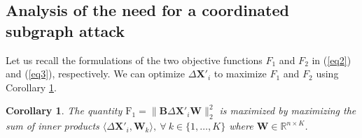 \documentclass[conference,compsoc]{IEEEtran}
\newtheorem{cor}{Corollary}[thm]
\begin{document}
\subsection{Analysis of the need for a coordinated subgraph attack}
\par Let us recall the formulations of the two objective functions $F_1$ and $F_2$ in (\ref{eq2}) and (\ref{eq3}), respectively. We can optimize $\Delta \boldsymbol{X'}_i$ to maximize $F_1$ and $F_2$ using Corollary \ref{corollary}.
\begin{cor}
\label{corollary}
The quantity
$\mathrm{F}_1=\|\boldsymbol{B} \Delta \boldsymbol{X'}_i \boldsymbol{W}\|_2^2$
is maximized by maximizing the sum of inner products $\langle\Delta \boldsymbol{X'}_i, \boldsymbol{W}_k \rangle, ~\forall~k \in \{1, \ldots, K\} $ where $\boldsymbol{W} \in \mathbb{R}^{n\times K}$.
\end{cor}
\end{document}
